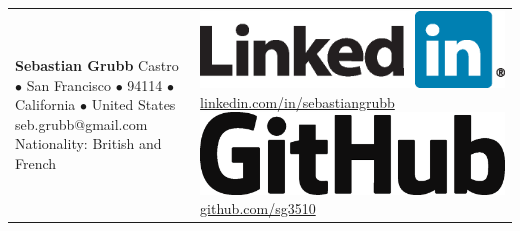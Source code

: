 \documentclass[a4paper,10pt,oneside]{article}
\begin{document}
\begin{tabular}{p{}>{\raggedright}p{}}
\textbf{\huge Sebastian Grubb} \newline
324 Castro  $\bullet$ San Francisco  $\bullet$ 94114 $\bullet$ California $\bullet$ United States \newline
seb.grubb@gmail.com \newline
Nationality: British and French
&
\includegraphics[scale=.175]{Images/LinkedIn.eps} \newline
\href{http://linkedin.com/in/sebastiangrubb}{linkedin.com/in/sebastiangrubb} \newline
\includegraphics[scale=.075]{Images/GitHub_Logo.eps} \newline
\href{http://github.com/sg3510}{github.com/sg3510}
\end{tabular}








\end{document}
